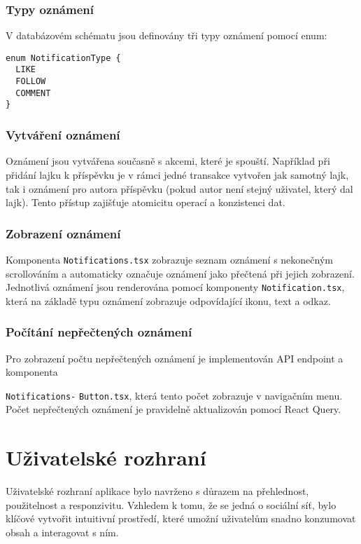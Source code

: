 \documentclass[12pt]{article}
\begin{document}
\subsubsection{Typy oznámení}

V databázovém schématu jsou definovány tři typy oznámení pomocí enum:

\begin{verbatim}
enum NotificationType {
  LIKE
  FOLLOW
  COMMENT
}
\end{verbatim}

\subsubsection{Vytváření oznámení}

Oznámení jsou vytvářena současně s akcemi, které je spouští. Například při přidání lajku k příspěvku je v rámci jedné transakce vytvořen jak samotný lajk, tak i oznámení pro autora příspěvku (pokud autor není stejný uživatel, který dal lajk). Tento přístup zajišťuje atomicitu operací a konzistenci dat.

\subsubsection{Zobrazení oznámení}

Komponenta \texttt{Notifications.tsx} zobrazuje seznam oznámení s nekonečným scrollováním a automaticky označuje oznámení jako přečtená při jejich zobrazení. Jednotlivá oznámení jsou renderována pomocí komponenty \texttt{Notification.tsx}, která na základě typu oznámení zobrazuje odpovídající ikonu, text a odkaz.

\subsubsection{Počítání nepřečtených oznámení}

Pro zobrazení počtu nepřečtených oznámení je implementován API endpoint a komponenta

\texttt{Notifications-}
\texttt{Button.tsx}, která tento počet zobrazuje v navigačním menu. Počet nepřečtených oznámení je pravidelně aktualizován pomocí React Query.

\newpage
\section{Uživatelské rozhraní}

Uživatelské rozhraní aplikace bylo navrženo s důrazem na přehlednost, použitelnost a responzivitu. Vzhledem k tomu, že se jedná o sociální síť, bylo klíčové vytvořit intuitivní prostředí, které umožní uživatelům snadno konzumovat obsah a interagovat s ním.
\end{document}
